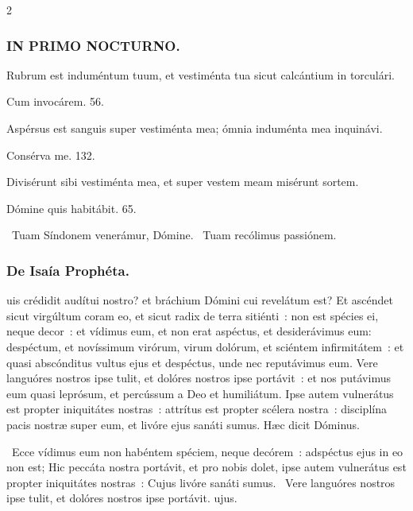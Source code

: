 \documentclass[9pt,twoside]{extarticle}
\begin{document}
\begin{multicols}{2}
\subsubsection*{\center \textsc{IN PRIMO NOCTURNO.}}
\begin{tightlist}{}
\item {} Rubrum est induméntum tuum, et vestiménta tua sicut calcántium in torculári.
\item {} Cum invocárem. 56.
\item {} Aspérsus est sanguis super vestiménta mea; ómnia induménta mea inquinávi.
\item {} Consérva me. 132.
\item {} Divisérunt sibi vestiménta mea, et super vestem meam misérunt sortem.
\item {} Dómine quis habitábit. 65.
\item {}~Tuam Síndonem venerámur, Dómine. ~Tuam recólimus passiónem.
\end{tightlist}

\subsubsection*{\center De Isaía Prophéta.}
\begin{center}\end{center}
uis crédidit audítui nostro? et bráchium Dómini cui revelátum est?
Et ascéndet sicut virgúltum coram eo, et sicut radix de terra sitiénti~: non est spécies ei, neque decor~: et vídimus eum, et non erat aspéctus, et desiderávimus eum:
despéctum, et novíssimum virórum, virum dolórum, et sciéntem infirmitátem~: et quasi abscónditus vultus ejus et despéctus, unde nec reputávimus eum.
Vere languóres nostros ipse tulit, et dolóres nostros ipse portávit~: et nos putávimus eum quasi leprósum, et percússum a Deo et humiliátum.
Ipse autem vulnerátus est propter iniquitátes nostras~: attrítus est propter scélera nostra~: disciplína pacis nostræ super eum, et livóre ejus sanáti sumus. Hæc dicit Dóminus.

\begin{tightlist}{}
\item {}~Ecce vídimus eum non habéntem spéciem, neque decórem~: adspéctus ejus in eo non est; Hic peccáta nostra portávit, et pro nobis dolet, ipse autem vulnerátus est propter iniquitátes nostras~: \textred{*} Cujus livóre sanáti sumus. ~Vere languóres nostros ipse tulit, et dolóres nostros ipse portávit. ujus.
\end{tightlist}


\end{multicols}
\end{document}
